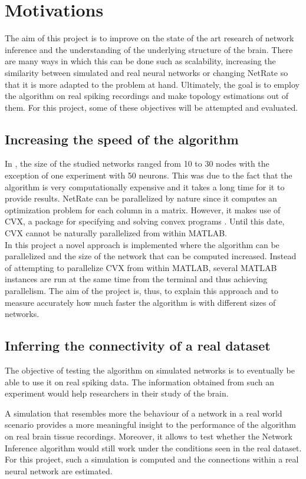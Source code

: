 \section{Motivations}

The aim of this project is to improve on the state of the art research of network inference and the understanding of the underlying structure of the brain. There are many ways in which this can be done such as scalability, increasing the similarity between simulated and real neural networks or changing NetRate so that it is more adapted to the problem at hand. Ultimately, the goal is to employ the algorithm on real spiking recordings and make topology estimations out of them. For this project, some of these objectives will be attempted and evaluated.

\subsection{Increasing the speed of the algorithm}

In \cite{alexandru2018estimating}, the size of the studied networks ranged from 10 to 30 nodes with the exception of one experiment with 50 neurons. This was due to the fact that the algorithm is very computationally expensive and it takes a long time for it to provide results. NetRate can be parallelized by nature since it computes an optimization problem for each column in a matrix. However, it makes use of CVX, a package for specifying and solving convex programs \cite{cvx,gb08}. Until this date, CVX cannot be naturally parallelized from within MATLAB. \\

In this project a novel approach is implemented where the algorithm can be parallelized and the size of the network that can be computed increased. Instead of attempting to parallelize CVX from within MATLAB, several MATLAB instances are run at the same time from the terminal and thus achieving parallelism. The aim of the project is, thus, to explain this approach and to measure accurately how much faster the algorithm is with different sizes of networks. 

\subsection{Inferring the connectivity of a real dataset}

The objective of testing the algorithm on simulated networks is to eventually be able to use it on real spiking data. The information obtained from such an experiment would help researchers in their study of the brain. 

A simulation that resembles more the behaviour of a network in a real world scenario provides a more meaningful insight to the performance of the algorithm on real brain tissue recordings. Moreover, it allows to test whether the Network Inference algorithm would still work under the conditions seen in the real dataset. For this project, such a simulation is computed and the connections within a real neural network are estimated.

